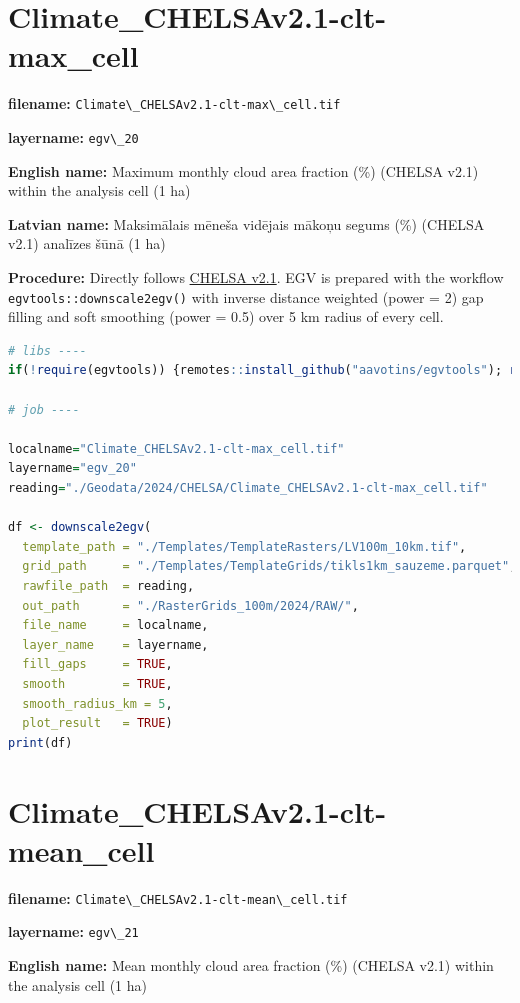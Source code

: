 \documentclass[
]{book}
\newcommand{\passthrough}[1]{#1}
\begin{document}
\section{Climate\_CHELSAv2.1-clt-max\_cell}\label{ch06.020}

\textbf{filename:} \passthrough{\lstinline!Climate\_CHELSAv2.1-clt-max\_cell.tif!}

\textbf{layername:} \passthrough{\lstinline!egv\_20!}

\textbf{English name:} Maximum monthly cloud area fraction (\%) (CHELSA v2.1) within the analysis cell (1 ha)

\textbf{Latvian name:} Maksimālais mēneša vidējais mākoņu segums (\%) (CHELSA v2.1) analīzes šūnā (1 ha)

\textbf{Procedure:} Directly follows \hyperref[Ch04.11]{CHELSA v2.1}. EGV is prepared with the
workflow \passthrough{\lstinline!egvtools::downscale2egv()!} with inverse distance weighted (power = 2)
gap filling and soft smoothing (power = 0.5) over 5 km radius of every cell.

\begin{lstlisting}[language=R]
# libs ----
if(!require(egvtools)) {remotes::install_github("aavotins/egvtools"); require(egvtools)}

# job ----

localname="Climate_CHELSAv2.1-clt-max_cell.tif"
layername="egv_20"
reading="./Geodata/2024/CHELSA/Climate_CHELSAv2.1-clt-max_cell.tif"

df <- downscale2egv(
  template_path = "./Templates/TemplateRasters/LV100m_10km.tif",
  grid_path     = "./Templates/TemplateGrids/tikls1km_sauzeme.parquet",
  rawfile_path  = reading,
  out_path      = "./RasterGrids_100m/2024/RAW/",
  file_name     = localname,
  layer_name    = layername,
  fill_gaps     = TRUE,
  smooth        = TRUE,
  smooth_radius_km = 5,
  plot_result   = TRUE)
print(df)
\end{lstlisting}

\section{Climate\_CHELSAv2.1-clt-mean\_cell}\label{ch06.021}

\textbf{filename:} \passthrough{\lstinline!Climate\_CHELSAv2.1-clt-mean\_cell.tif!}

\textbf{layername:} \passthrough{\lstinline!egv\_21!}

\textbf{English name:} Mean monthly cloud area fraction (\%) (CHELSA v2.1) within the analysis cell (1 ha)
\end{document}
